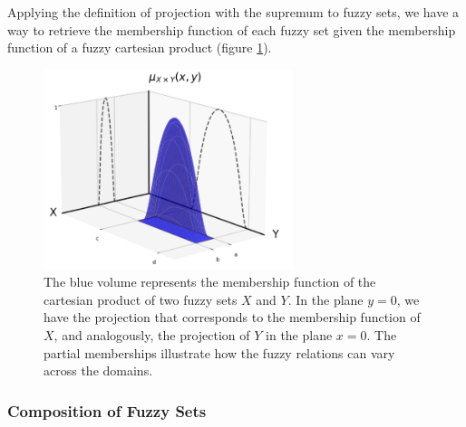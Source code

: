 Applying the definition of projection with the supremum to fuzzy sets, we have a way to retrieve the membership function of each fuzzy set given the membership function of a fuzzy cartesian product (figure \ref{fig:fuzzy_cart_prod}). \\






\begin{figure}[ht]
    \centering
    \includegraphics[width=0.65\textwidth]{ch1/figures/fuzzy_cart_prod.png}
    \caption{The blue volume represents the membership function of the cartesian product of two fuzzy sets $X$ and $Y$. In the plane $y=0$, we have the projection that corresponds to the membership function of $X$, and analogously, the projection of $Y$ in the plane $x=0$. The partial memberships illustrate how the fuzzy relations can vary across the domains.}
    \label{fig:fuzzy_cart_prod}
\end{figure}


\subsubsection*{Composition of Fuzzy Sets}



